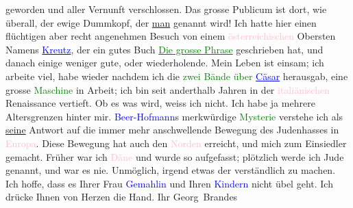                geworden und aller Vernunft verschlossen. Das grosse Publicum ist dort, wie überall,
               der ewige Dummkopf, der \uline{man} genannt wird! {\pb}Ich hatte hier einen flüchtigen
               aber recht angenehmen Besuch von einem \textcolor{pink}{österreichischen}{}\ledrightnote{\textcolor{pink}{Österreich}} Obersten Namens \textcolor{blue}{\uline{Kreutz}}{}\ledrightnote{\textcolor{blue}{Rudolf Jeremias Kreutz}}, der ein gutes Buch \textcolor{green}{\uline{Die grosse Phrase}}{}\ledrightnote{\textcolor{green}{Die große Phrase}} geschrieben hat, und danach einige weniger gute, oder wiederholende.\pend
           \pstart
           Mein Leben ist einsam; ich arbeite viel, habe wieder nachdem ich die \textcolor{green}{zwei Bände über \textcolor{blue}{\uline{Cäsar}}{}\ledrightnote{\textcolor{blue}{Gaius Iulius Caesar}}}{} herausgab, eine grosse \textcolor{green}{Maschine}{} in Arbeit; ich bin \introOben{}seit anderthalb Jahren\introOben{}
               in der \textcolor{pink}{italiänischen}{}\ledrightnote{\textcolor{pink}{Italien}} Renaissance vertieft. Ob es
               was wird, weiss ich nicht. Ich habe ja mehrere Altersgrenzen hinter mir.\pend
           \pstart
           \textcolor{blue}{Beer-Hofmann}{}\ledrightnote{\textcolor{blue}{Richard Beer-Hofmann}}s merkwürdige \textcolor{green}{Mysterie}{} verstehe ich als \uline{seine} Antwort auf die immer mehr anschwellende Bewegung des
               Judenhasses in \textcolor{pink}{Europa}{}\ledrightnote{\textcolor{pink}{Europa}}. Diese Bewegung hat auch den
                  \textcolor{pink}{Norden}{}\ledrightnote{\textcolor{pink}{Skandinavien}} erreicht, und mich zum Einsiedler gemacht.
               Früher war ich \textcolor{pink}{Däne}{}\ledrightnote{\textcolor{pink}{Dänemark}} und wurde so aufgefasst;
               plötzlich werde ich Jude genannt, und war es nie. Unmöglich, irgend etwas der \label{K_L02342_2v}\label{K_L02342_2h} verständlich zu machen.\pend
           \pstart
           Ich hoffe, dass es Ihrer Frau \textcolor{blue}{Gemahlin}{} und Ihren \textcolor{blue}{Kindern}{} nicht übel geht. Ich drücke Ihnen von Herzen die Hand.\pend
           \pstart Ihr \spacefill\mbox{Georg Brandes}\pend{}\endnumbering{}  
      